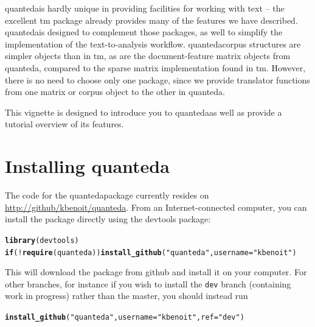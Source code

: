 \documentclass[11pt]{article}\usepackage[]{graphicx}\usepackage[]{color}
\makeatletter
\newcommand{\hlstr}[1]{\textcolor[rgb]{0.192,0.494,0.8}{#1}}%
\newcommand{\hlopt}[1]{\textcolor[rgb]{0,0,0}{#1}}%
\newcommand{\hlstd}[1]{\textcolor[rgb]{0.345,0.345,0.345}{#1}}%
\newcommand{\hlkwa}[1]{\textcolor[rgb]{0.161,0.373,0.58}{\textbf{#1}}}%
\newcommand{\hlkwc}[1]{\textcolor[rgb]{0.333,0.667,0.333}{#1}}%
\newcommand{\hlkwd}[1]{\textcolor[rgb]{0.737,0.353,0.396}{\textbf{#1}}}%
\newenvironment{kframe}{%
 \def\at@end@of@kframe{}%
 \ifinner\ifhmode%
  \def\at@end@of@kframe{\end{minipage}}%
  \begin{minipage}{\columnwidth}%
 \fi\fi%
 \def\FrameCommand##1{\hskip\@totalleftmargin \hskip-\fboxsep
 \colorbox{shadecolor}{##1}\hskip-\fboxsep
     \hskip-\linewidth \hskip-\@totalleftmargin \hskip\columnwidth}%
 \MakeFramed {\advance\hsize-\width
   \@totalleftmargin\z@ \linewidth\hsize
   \@setminipage}}%
 {\par\unskip\endMakeFramed%
 \at@end@of@kframe}
\newenvironment{knitrout}{}{} %
\newcommand{\quanteda}{\textsf{quanteda}}
\makeatother
\begin{document}
\quanteda is hardly unique in providing facilities for working with
text -- the excellent \textsf{tm} package already provides many of the
features we have described.  \quanteda is designed to complement those
packages, as well to simplify the implementation of the
text-to-analysis workflow.  \quanteda corpus structures are simpler
objects than in \textsf{tm}, as are the document-feature matrix
objects from \quanteda, compared to the sparse matrix implementation
found in \textsf{tm}.  However, there is no need to choose only one
package, since we provide translator functions from one matrix or
corpus object to the other in \quanteda.

This vignette is designed to introduce you to \quanteda as well as
provide a tutorial overview of its features.

\section{Installing \quanteda}

The code for the \quanteda package currently resides on
\url{http://github/kbenoit/quanteda}.  From an Internet-connected
computer, you can install the package directly using the
\textsf{devtools} package:

\begin{knitrout}\footnotesize
{}\color{fgcolor}\begin{kframe}
\begin{alltt}
\hlkwd{library}\hlstd{(devtools)}
\hlkwa{if} \hlstd{(}\hlopt{!}\hlkwd{require}\hlstd{(quanteda))} \hlkwd{install_github}\hlstd{(}\hlstr{"quanteda"}\hlstd{,} \hlkwc{username}\hlstd{=}\hlstr{"kbenoit"}\hlstd{)}
\end{alltt}
\end{kframe}
\end{knitrout}

This will download the package from github and install it on your computer.
For other branches, for instance if you wish to install the
\texttt{dev} branch (containing work in progress) rather than the
master, you should instead run

\begin{knitrout}\footnotesize
{}\color{fgcolor}\begin{kframe}
\begin{alltt}
\hlkwd{install_github}\hlstd{(}\hlstr{"quanteda"}\hlstd{,} \hlkwc{username}\hlstd{=}\hlstr{"kbenoit"}\hlstd{,} \hlkwc{ref}\hlstd{=}\hlstr{"dev"}\hlstd{)}
\end{alltt}
\end{kframe}
\end{knitrout}
\end{document}
